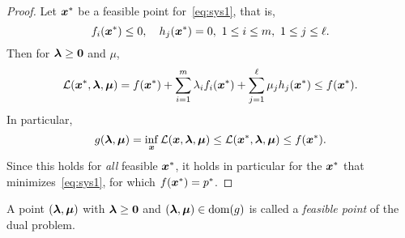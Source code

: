 \begin{proof}
 Let $\bm{x}^*$ be a feasible point for~\eqref{eq:sys1}, that is,
 \begin{equation*}
  f_i(\vct{x}^*)\leq 0, \quad h_j(\vct{x}^*)=0,\ 1\leq i\leq m, \ 1\leq j\leq \ell.
 \end{equation*}
Then for $\bm{\lambda}\geq \bm{0}$ and $\mu$,
\begin{equation*}
 \mathcal{L}(\bm{x}^*,\bm{\lambda},\bm{\mu}) = f(\bm{x}^*)+\sum_{i=1}^m \lambda_if_i(\bm{x}^*)+\sum_{j=1}^\ell \mu_j h_j(\bm{x}^*)\leq f(\bm{x}^*).
\end{equation*}
In particular,
\begin{equation*}
 g(\bm{\lambda},\bm{\mu}) = \inf_{\bm{x}} \mathcal{L}(\bm{x},\bm{\lambda},\bm{\mu}) \leq \mathcal{L}(\bm{x}^*,\bm{\lambda},\bm{\mu}) \leq f(\bm{x}^*).
\end{equation*}
Since this holds for {\em all} feasible $\bm{x}^*$, it holds in particular for the $\bm{x}^*$ that minimizes~\eqref{eq:sys1}, for which $f(\bm{x}^*)=p^*$. 
\end{proof}

A point $(\bm{\lambda},\bm{\mu})$ with $\bm{\lambda}\geq \bm{0}$ and $(\bm{\lambda},\bm{\mu})\in \mathrm{dom}(g)$ is called a {\em feasible point} of the dual problem.

